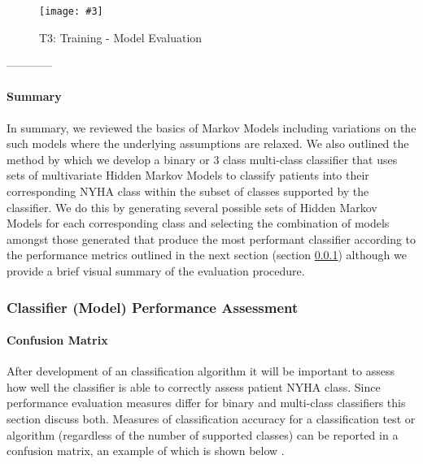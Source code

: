 \documentclass[]{article}
\newcommand\landscapeFigure[4]{
	\newgeometry{left=#1,right=#1,top=#1}
	\begin{landscape}
		\begin{figure}
			\centering
			\texttt{[image: \#3]}
			\caption{#2}
			\label{#4}
		\end{figure}
	\end{landscape}
	\restoregeometry
}
\begin{document}
\landscapeFigure{1cm}{T3: Training - Model Evaluation}{../modelDevelopmentFlowcharts/T3-Training_Model_Evaluation.png}{fig:T3}

------------

\paragraph{Summary}

In summary, we reviewed the basics of Markov Models including variations on the such models where the underlying assumptions are relaxed. We also outlined the method by which we develop a binary or 3 class multi-class classifier that uses sets of multivariate Hidden Markov Models to classify patients into their corresponding NYHA class within the subset of classes supported by the classifier. We do this by generating several possible sets of Hidden Markov Models for each corresponding class and selecting the combination of models amongst those generated that produce the most performant classifier according to the performance metrics outlined in the next section (section \ref{sec:classperformance}) although we provide a brief visual summary of the evaluation procedure.

\subsubsection{Classifier (Model) Performance Assessment} \label{sec:classperformance}

\paragraph{Confusion Matrix}

After development of an classification algorithm it will be important to assess how well the classifier is able to correctly assess patient NYHA class. Since performance evaluation measures differ for binary and multi-class classifiers this section discuss both. Measures of classification accuracy for a classification test or algorithm (regardless of the number of supported classes) can be reported in a confusion matrix, an example of which is shown below \cite{Sayad,MedCalc2017,Davis2006,Flach2004}.
\end{document}
